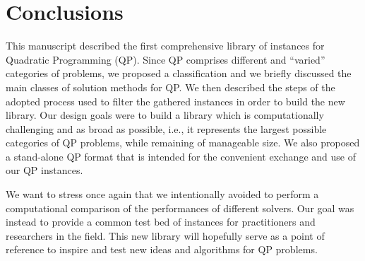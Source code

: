 \section{Conclusions}\label{sec:conclusions}


This manuscript described the first comprehensive library of instances for Quadratic Programming (QP). Since QP comprises  different and ``varied'' categories of problems, we proposed a classification and we briefly discussed the main classes of solution methods for QP.
We then described the steps of the adopted process used to filter the gathered instances  in order to build the new library. Our design goals were to build a library which is computationally challenging and as broad as possible, i.e., it represents the largest possible categories of QP problems, while remaining of manageable size. We also proposed a stand-alone QP format that is intended
for the convenient exchange and use of our QP instances.


We want to stress once again that we intentionally avoided to perform a computational comparison of the performances of different solvers. Our goal was instead to provide a common test bed of instances for practitioners and researchers in the field. This new library will hopefully serve as a point of reference to inspire and test new ideas and algorithms for QP problems.

